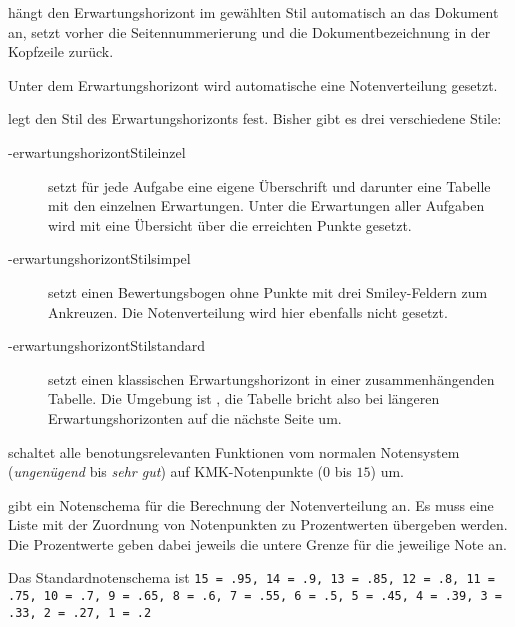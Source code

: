 \begin{options}
     hängt den Erwartungshorizont im gewählten Stil automatisch an das Dokument an, setzt vorher die Seitennummerierung und die Dokumentbezeichnung in der Kopfzeile zurück.

    Unter dem Erwartungshorizont wird automatische eine Notenverteilung gesetzt.


         legt den Stil des Erwartungshorizonts fest.
        Bisher gibt es drei verschiedene Stile:
        \begin{description}
            \item[\keyis-{erwartungshorizontStil}{einzel}\space] setzt für jede Aufgabe eine eigene Überschrift und darunter eine Tabelle mit den einzelnen Erwartungen. Unter die Erwartungen aller Aufgaben wird mit  eine Übersicht über die erreichten Punkte gesetzt.


            \item[\keyis-{erwartungshorizontStil}{simpel}\space] setzt einen Bewertungsbogen ohne Punkte mit drei Smiley-Feldern zum Ankreuzen. Die Notenverteilung wird hier ebenfalls nicht gesetzt.


            \item[\keyis-{erwartungshorizontStil}{standard}\space] setzt einen klassischen Erwartungshorizont in einer zusammenhängenden Tabelle. Die Umgebung ist , die Tabelle bricht also bei längeren Erwartungshorizonten auf die nächste Seite um.

        \end{description}

     schaltet alle benotungsrelevanten Funktionen vom normalen Notensystem (\textit{ungenügend} bis \textit{sehr gut}) auf KMK-Notenpunkte ($0$ bis $15$) um.

     gibt ein Notenschema für die Berechnung der Notenverteilung an. Es muss eine Liste mit der Zuordnung von Notenpunkten zu Prozentwerten übergeben werden. Die Prozentwerte geben dabei jeweils die untere Grenze für die jeweilige Note an.

    Das Standardnotenschema ist \texttt{15 = .95, 14 = .9, 13 = .85, 12 = .8, 11 = .75, 10 = .7, 9 = .65, 8 = .6, 7 = .55, 6 = .5, 5 = .45, 4 = .39, 3 = .33, 2 = .27, 1 = .2}
\end{options}

